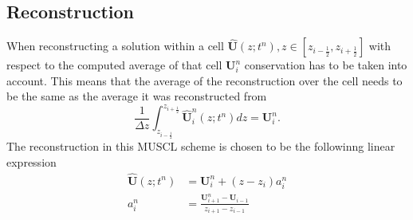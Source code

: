 \documentclass[a4paper, oneside]{discothesis}
\begin{document}
\subsection{Reconstruction} \label{ssec:reco}
When reconstructing a solution within a cell $\mathbf{\hat{U}}(z;t^n), z \in [z_{i-\frac{1}{2}}, z_{i+\frac{1}{2}}]$ with respect to the computed average of that cell $\mathbf{U}_i^n$ conservation has to be taken into account.
This means that the average of the reconstruction over the cell needs to be the same as the average it was reconstructed from 
\begin{equation}
	\frac{1}{\Delta z} \int_{z_{i-\frac{1}{2}}}^{z_{i+\frac{1}{2}}} \mathbf{\hat{U}}_i^n(z;t^n) dz = \mathbf{U}_i^n.
\end{equation}
The reconstruction in this MUSCL scheme is chosen to be the followinng linear expression
\begin{align}
	\mathbf{\hat{U}}(z;t^n) &= \mathbf{U}_i^n + (z-z_i)a_i^n \\
	a_i^n &= \frac{\mathbf{U}_{i+1}^n - \mathbf{U}_{i-1}}{z_{i+1} - z_{i-1}}
\end{align}
\end{document}
